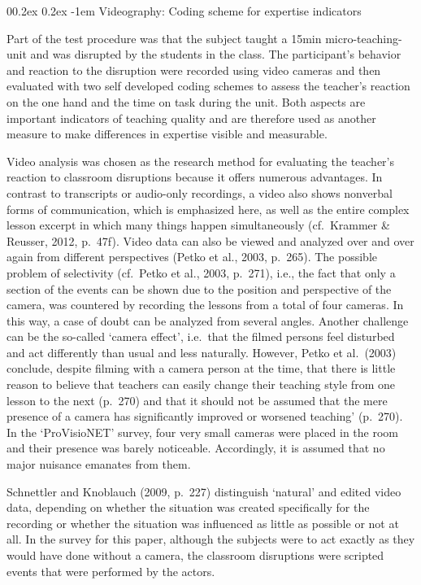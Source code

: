 \documentclass[
  man]{apa6}
\makeatletter
\let\oldparagraph\paragraph
\renewcommand{\paragraph}[1]{\oldparagraph{#1}\mbox{}}
\renewcommand{\paragraph}{\@startsection{paragraph}{4}{\parindent}%
  {0\baselineskip \@plus 0.2ex \@minus 0.2ex}%
  {-1em}%
  {\normalfont\normalsize\bfseries\itshape\typesectitle}}
\makeatother
\begin{document}
\paragraph{Videography: Coding scheme for expertise indicators}\label{videography-coding-scheme-for-expertise-indicators}

Part of the test procedure was that the subject taught a 15min micro-teaching-unit and was disrupted by the students in the class. The participant's behavior and reaction to the disruption were recorded using video cameras and then evaluated with two self developed coding schemes to assess the teacher's reaction on the one hand and the time on task during the unit. Both aspects are important indicators of teaching quality and are therefore used as another measure to make differences in expertise visible and measurable.

Video analysis was chosen as the research method for evaluating the teacher's reaction to classroom disruptions because it offers numerous advantages. In contrast to transcripts or audio-only recordings, a video also shows nonverbal forms of communication, which is emphasized here, as well as the entire complex lesson excerpt in which many things happen simultaneously (cf.~Krammer \& Reusser, 2012, p.~47f). Video data can also be viewed and analyzed over and over again from different perspectives (Petko et al., 2003, p.~265). The possible problem of selectivity (cf.~Petko et al., 2003, p.~271), i.e., the fact that only a section of the events can be shown due to the position and perspective of the camera, was countered by recording the lessons from a total of four cameras. In this way, a case of doubt can be analyzed from several angles. Another challenge can be the so-called `camera effect', i.e.~that the filmed persons feel disturbed and act differently than usual and less naturally. However, Petko et al.~(2003) conclude, despite filming with a camera person at the time, that there is little reason to believe that teachers can easily change their teaching style from one lesson to the next (p.~270) and that it should not be assumed that the mere presence of a camera has significantly improved or worsened teaching' (p.~270). In the `ProVisioNET' survey, four very small cameras were placed in the room and their presence was barely noticeable. Accordingly, it is assumed that no major nuisance emanates from them.

Schnettler and Knoblauch (2009, p.~227) distinguish `natural' and edited video data, depending on whether the situation was created specifically for the recording or whether the situation was influenced as little as possible or not at all. In the survey for this paper, although the subjects were to act exactly as they would have done without a camera, the classroom disruptions were scripted events that were performed by the actors.
\end{document}

